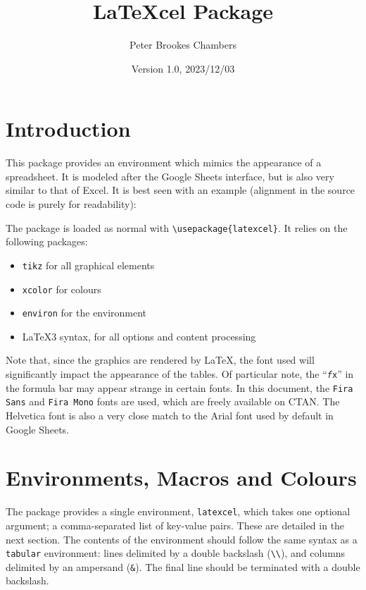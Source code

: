\documentclass[table]{article}
\title{LaTeXcel Package}
\author{Peter Brookes Chambers}
\date{Version 1.0, 2023/12/03}
\newcommand{\loadexample}[1]{
    \qoinputlisting[mdframed options = {nobreak=true}]{examples/#1.tex}
    \begin{centeredbox}
        
    \end{centeredbox}
}
\newcommand{\semibold}[1]{{\firabook #1}}
\newcommand{\emphasis}[1]{{\color{Red}\semibold{#1}}}
\begin{document}
\maketitle

\tableofcontents

\clearpage

\section{Introduction}

This package provides an environment which mimics the appearance of a spreadsheet. It is modeled after the Google Sheets interface, but is also very similar to that of Excel. It is best seen with an example (alignment in the source code is purely for readability):

\loadexample{full_example}

The package is loaded as normal with \verb|\usepackage{latexcel}|. It relies on the following packages:
\begin{itemize}
    \item \texttt{tikz} for all graphical elements
    \item \texttt{xcolor} for colours
    \item \texttt{environ} for the environment
    \item \LaTeX3 syntax, for all options and content processing
\end{itemize}

Note that, since the graphics are rendered by \LaTeX, the font used will significantly impact the appearance of the tables. Of particular note, the ``{\texttt{\textit{\selectfont f}}\hspace{-0.5ex}\texttt{\selectfont x}}'' in the formula bar may appear strange in certain fonts. In this document, the \texttt{Fira Sans} and \texttt{Fira Mono} fonts are used, which are freely available on CTAN. The Helvetica font is also a very close match to the Arial font used by default in Google Sheets.

\section{Environments, Macros and Colours}
\label{sec:environments_macros_colours}

The package provides a single environment, \verb|latexcel|, which takes one optional argument; a comma-separated list of key-value pairs. These are detailed in the next section. The contents of the environment should follow the same syntax as a \texttt{tabular} environment: lines delimited by a double backslash (\verb|\\|), and columns delimited by an ampersand (\verb|&|). The final line should \emphasis{not} be terminated with a double backslash.
\end{document}
